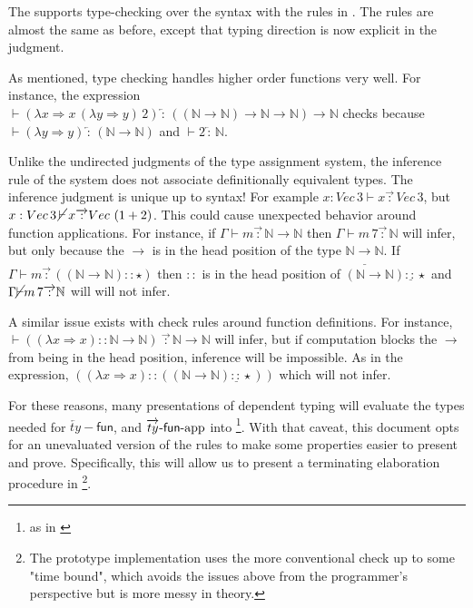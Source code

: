 The \slang{} supports \bidir{} type-checking over the syntax with the rules in .
The rules are almost the same as before, except that typing direction is now explicit in the judgment.
 
As mentioned, \bidir{} type checking handles higher order functions very well.
For instance, the expression $\vdash(\lambda x\Rightarrow x\,(\lambda y\Rightarrow y)\,2)\overleftarrow{\,:\,}\left(\left(\mathbb{N}\rightarrow\mathbb{N}\right)\rightarrow\mathbb{N}\rightarrow\mathbb{N}\right)\rightarrow\mathbb{N}$ checks because $\vdash(\lambda y\Rightarrow y)\overleftarrow{\,:\,}\left(\mathbb{N}\rightarrow\mathbb{N}\right)$ and $\vdash2\overleftarrow{\,:\,}\mathbb{N}$.
 
Unlike the undirected judgments of the type assignment system, the inference rule of the \bidir{} system does not associate definitionally equivalent types.
The inference judgment is unique up to syntax!
For example $x:Vec\,3\vdash x\overrightarrow{\,:\,}Vec\,3$, but $x:Vec\,3\, \cancel{\vdash}\, x\overrightarrow{\,:\,}Vec\,\left(1+2\right)$.
This could cause unexpected behavior around function applications.
For instance, if $\Gamma\vdash m\overrightarrow{\,:\,}\mathbb{N}\rightarrow\mathbb{N}$ then $\Gamma\vdash m\,7\overrightarrow{\,:\,}\mathbb{N}$ will infer, but only because the $\rightarrow$ is in the head position of the type $\mathbb{N}\underline{\rightarrow}\mathbb{N}$.
If $\Gamma\vdash m\overrightarrow{\,:\,}\left((\mathbb{N}\rightarrow\mathbb{N})::\star\right)$ then $::$ is in the head position of $(\mathbb{N}\rightarrow\mathbb{N})\underline{::}\star$ and $\Gamma\cancel{\vdash}m\,7\overrightarrow{\,:\,}\mathbb{N}$ will will not infer.
 
A similar issue exists with check rules around function definitions.
For instance, $\vdash\left((\lambda x\Rightarrow x)::\mathbb{N}\rightarrow\mathbb{N}\right)\ \overrightarrow{\,:\,}\mathbb{N}\rightarrow\mathbb{N}$ will infer, but if computation blocks the $\rightarrow$ from being in the head position, inference will be impossible.
As in the expression, $\left((\lambda x\Rightarrow x)::\left((\mathbb{N}\rightarrow\mathbb{N})\underline{::}\star\right)\right)$ which will not infer.
 
For these reasons, many presentations of \bidir{} dependent typing will evaluate the types needed for $\overleftarrow{ty}-\mathsf{fun}$, and $\operatorname{\overrightarrow{ty}-\mathsf{fun}-app}$ into \whnf{}\footnote{
 as in \cite{COQUAND1996167}
}.
With that caveat, this document opts for an unevaluated version of the rules to make some properties easier to present and prove.
Specifically, this will allow us to present a terminating elaboration procedure in \footnote{
 The prototype implementation uses the more conventional \whnf{} check up to some "time bound", which avoids the issues above from the programmer's perspective but is more messy in theory.
}.

